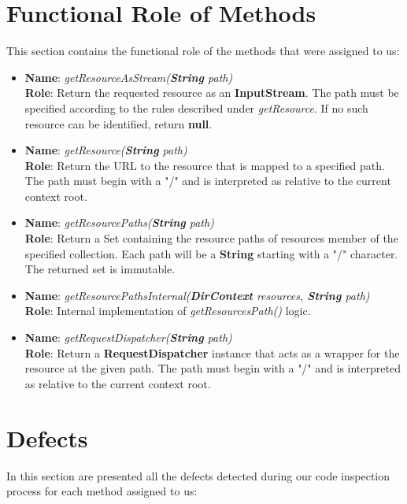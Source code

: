 \section{Functional Role of Methods}
This section contains the functional role of the methods that were assigned to us:
\begin{itemize}
	\item \textbf{Name}: \textit{getResourceAsStream(\textbf{String} path)}\\
		\textbf{Role}: Return the requested resource as an \textbf{InputStream}. The path must be specified according to the rules described under \textit{getResource}. If no such resource can be identified, return \textbf{null}.
	\item \textbf{Name}: \textit{getResource(\textbf{String} path)}\\
		\textbf{Role}: Return the URL to the resource that is mapped to a specified path. The path must begin with a "/" and is interpreted as relative to the current context root.
	\item \textbf{Name}: \textit{getResourcePaths(\textbf{String} path)}\\
		\textbf{Role}: Return a Set containing the resource paths of resources member of the specified collection. Each path will be a \textbf{String} starting with a "/" character. The returned set is immutable.
	\item \textbf{Name}: \textit{getResourcePathsInternal(\textbf{DirContext} resources, \textbf{String} path)}\\
		\textbf{Role}: Internal implementation of \textit{getResourcesPath()} logic.
	\item \textbf{Name}: \textit{getRequestDispatcher(\textbf{String} path)}\\
		\textbf{Role}: Return a \textbf{RequestDispatcher} instance that acts as a wrapper for the resource at the given path. The path must begin with a "/" and is interpreted as relative to the current context root.
\end{itemize}

\section{Defects}
In this section are presented all the defects detected during our code inspection process for each method assigned to us:

